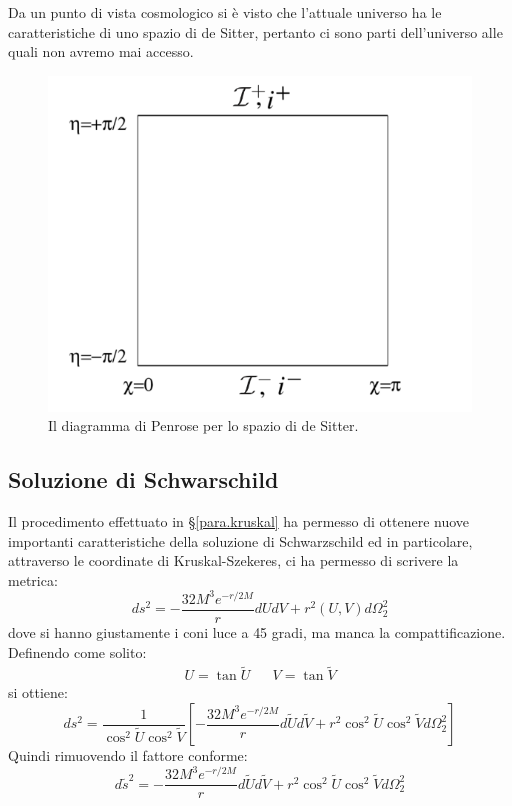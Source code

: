 Da un punto di vista cosmologico si è visto che l'attuale universo ha le caratteristiche di uno spazio di de Sitter, pertanto ci sono parti dell'universo alle quali non avremo mai accesso.
\begin{figure}
    \centering
    \includegraphics[scale=0.6]{immagini/desitter_penrose.png}
    \caption{Il diagramma di Penrose per lo spazio di de Sitter.}
    \label{fig.pen_desitter}
\end{figure}
\subsection{Soluzione di Schwarschild}
Il procedimento effettuato in \S\ref{para.kruskal} ha permesso di ottenere nuove importanti caratteristiche della soluzione di Schwarzschild ed in particolare, attraverso le coordinate di Kruskal-Szekeres, ci ha permesso di scrivere la metrica:
\begin{equation*}
    ds^2 = -\frac{32M^3e^{-r/2M}}{r}dUdV + r^2(U,V)d\Omega_2^2
\end{equation*}
dove si hanno giustamente i coni luce a 45 gradi, ma manca la compattificazione. Definendo come solito:
\begin{align*}
    U=\tan\tilde{U} && V = \tan\tilde{V}
\end{align*}
si ottiene:
\begin{equation*}
    ds^2 = \frac{1}{\cos^2\tilde{U}\cos^2\tilde{V}} \left[  -\frac{32M^3 e^{-r/2M}}{r}d\tilde{U}d\tilde{V} + r^2\cos^2\tilde{U}\cos^2\tilde{V}d\Omega_2^2\right]
\end{equation*}
Quindi rimuovendo il fattore conforme:
\begin{equation*}
    d\tilde{s}^2 =  -\frac{32M^3 e^{-r/2M}}{r}d\tilde{U}d\tilde{V} + r^2\cos^2\tilde{U}\cos^2\tilde{V}d\Omega_2^2
\end{equation*}


